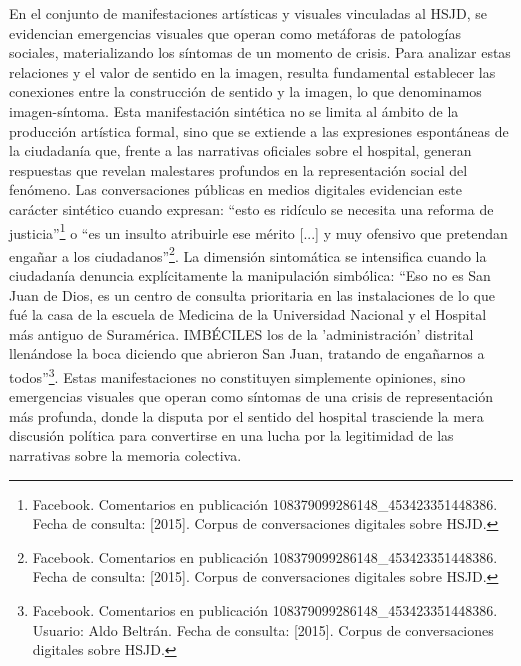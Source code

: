 En el conjunto de manifestaciones artísticas y visuales vinculadas al HSJD, se evidencian emergencias visuales que operan como metáforas de patologías sociales, materializando los síntomas de un momento de crisis. Para analizar estas relaciones y el valor de sentido en la imagen, resulta fundamental establecer las conexiones entre la construcción de sentido y la imagen, lo que denominamos imagen-síntoma. Esta manifestación sintética no se limita al ámbito de la producción artística formal, sino que se extiende a las expresiones espontáneas de la ciudadanía que, frente a las narrativas oficiales sobre el hospital, generan respuestas que revelan malestares profundos en la representación social del fenómeno. Las conversaciones públicas en medios digitales evidencian este carácter sintético cuando expresan: ``esto es ridículo se necesita una reforma de justicia''\footnote{Facebook. Comentarios en publicación 108379099286148\_453423351448386. Fecha de consulta: [2015]. Corpus de conversaciones digitales sobre HSJD.} o ``es un insulto atribuirle ese mérito [...] y muy ofensivo que pretendan engañar a los ciudadanos''\footnote{Facebook. Comentarios en publicación 108379099286148\_453423351448386. Fecha de consulta: [2015]. Corpus de conversaciones digitales sobre HSJD.}. La dimensión sintomática se intensifica cuando la ciudadanía denuncia explícitamente la manipulación simbólica: ``Eso no es San Juan de Dios, es un centro de consulta prioritaria en las instalaciones de lo que fué la casa de la escuela de Medicina de la Universidad Nacional y el Hospital más antiguo de Suramérica. IMBÉCILES los de la 'administración' distrital llenándose la boca diciendo que abrieron San Juan, tratando de engañarnos a todos''\footnote{Facebook. Comentarios en publicación 108379099286148\_453423351448386. Usuario: Aldo Beltrán. Fecha de consulta: [2015]. Corpus de conversaciones digitales sobre HSJD.}. Estas manifestaciones no constituyen simplemente opiniones, sino emergencias visuales que operan como síntomas de una crisis de representación más profunda, donde la disputa por el sentido del hospital trasciende la mera discusión política para convertirse en una lucha por la legitimidad de las narrativas sobre la memoria colectiva.

